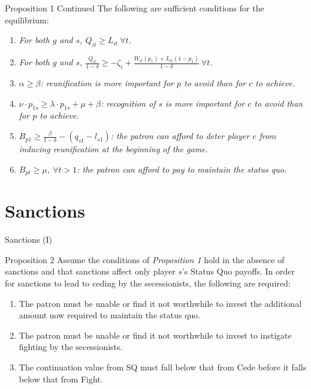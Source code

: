 \documentclass[handout]{beamer}
\begin{document}
\begin{frame}{Proposition 1 Continued}
\pause
  The following are sufficient conditions for the equilibrium:
	\begin{enumerate}[<+->]
		\item \textit{For both $g$ and $s$, $Q_{it} \geq L_{it} \ \forall t$.}

		\item \emph{For both $g$ and $s$, $\frac {Q_{it}}{1-\delta} \geq  -\zeta_i+\frac{W_{it}(p_1) + L_{it}(1-p_1)}{1-\delta} \ \forall t$.}

\item \textit{$\alpha \geq \beta$: reunification is more important for $p$ to avoid than for $c$ to achieve.}

\item  \textit{$\nu\cdot p_{1s} \geq \lambda \cdot p_{1s} + \mu + \beta$: recognition of $s$ is more important for $c$ to avoid than for $p$ to achieve.}

\item  \textit{$B_{p1} \geq\frac{\beta}{1-\delta} - \left(q_{s1} - l_{s1} \right)$: the patron can afford to deter player $c$ from inducing reunification at the beginning of the game.}

\item \textit{$B_{pt} \geq \mu, \ \forall t>1$: the patron can afford to pay to maintain the status quo.}
	\end{enumerate}
\end{frame}

\section{Sanctions}
\begin{frame}{Sanctions (I)}
\begin{beamerboxesrounded}[upper=palette tertiary, shadow=true]{Proposition 2}
  Assume the conditions of \emph{Proposition 1} hold in the absence of sanctions and that sanctions affect only player $s$'s Status Quo payoffs. In order for sanctions to lead to ceding by the secessionists, the following are required:
	\pause
	\begin{enumerate}[<+->]
\item The patron must be unable or find it not worthwhile to invest the additional amount now required to maintain the status quo.

\item The patron must be unable or find it not worthwhile to invest to instigate fighting by the secessionists.

\item The continuation value from SQ must fall below that from Cede before it falls below that from Fight.
\end{enumerate}

\end{beamerboxesrounded}

\end{frame}
\end{document}
